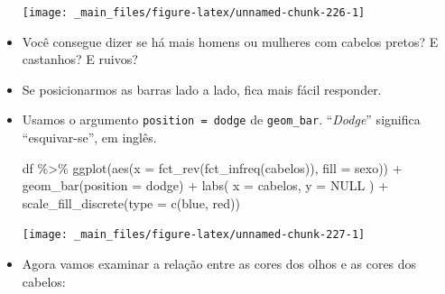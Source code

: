 \documentclass[
  11pt]{report}
\newenvironment{Shaded}{\begin{snugshade}}{\end{snugshade}}
\newcommand{\AttributeTok}[1]{\textcolor[rgb]{0.77,0.63,0.00}{#1}}
\newcommand{\ConstantTok}[1]{\textcolor[rgb]{0.00,0.00,0.00}{#1}}
\newcommand{\FunctionTok}[1]{\textcolor[rgb]{0.00,0.00,0.00}{#1}}
\newcommand{\NormalTok}[1]{#1}
\newcommand{\SpecialCharTok}[1]{\textcolor[rgb]{0.00,0.00,0.00}{#1}}
\newcommand{\StringTok}[1]{\textcolor[rgb]{0.31,0.60,0.02}{#1}}
\renewenvironment{Shaded}{
    \begin{mdframed}[%
      roundcorner=2pt,%
      innerleftmargin=5pt,%
      innerrightmargin=5pt,%
      topline=true,%
      leftline=true,%
      rightline=true,%
      bottomline=true,%
      linewidth=0.5pt,%
      linecolor=black!20,%
      backgroundcolor=black!2,%
      skipabove=2ex,%
      skipbelow=2.5ex%
    ]%
  }
  {
    \end{mdframed}
  }
\begin{document}
\begin{itemize}
  \begin{center}\texttt{[image: \_main\_files/figure-latex/unnamed-chunk-226-1]} \end{center}
\item
  Você consegue dizer se há mais homens ou mulheres com cabelos pretos? E castanhos? E ruivos?
\item
  Se posicionarmos as barras lado a lado, fica mais fácil responder.
\item
  Usamos o argumento \texttt{position\ =\ \textquotesingle{}dodge\textquotesingle{}} de \texttt{geom\_bar}. ``\emph{Dodge}'' significa ``esquivar-se'', em inglês.

\begin{Shaded}
\begin{Highlighting}[]
\NormalTok{df }\SpecialCharTok{\%\textgreater{}\%} 
  \FunctionTok{ggplot}\NormalTok{(}\FunctionTok{aes}\NormalTok{(}\AttributeTok{x =} \FunctionTok{fct\_rev}\NormalTok{(}\FunctionTok{fct\_infreq}\NormalTok{(cabelos)), }\AttributeTok{fill =}\NormalTok{ sexo)) }\SpecialCharTok{+}
    \FunctionTok{geom\_bar}\NormalTok{(}\AttributeTok{position =} \StringTok{\textquotesingle{}dodge\textquotesingle{}}\NormalTok{) }\SpecialCharTok{+}
    \FunctionTok{labs}\NormalTok{(}
      \AttributeTok{x =} \StringTok{\textquotesingle{}cabelos\textquotesingle{}}\NormalTok{,}
      \AttributeTok{y =} \ConstantTok{NULL}
\NormalTok{    ) }\SpecialCharTok{+}
    \FunctionTok{scale\_fill\_discrete}\NormalTok{(}\AttributeTok{type =} \FunctionTok{c}\NormalTok{(}\StringTok{\textquotesingle{}blue\textquotesingle{}}\NormalTok{, }\StringTok{\textquotesingle{}red\textquotesingle{}}\NormalTok{))}
\end{Highlighting}
\end{Shaded}

  \begin{center}\texttt{[image: \_main\_files/figure-latex/unnamed-chunk-227-1]} \end{center}
\item
  Agora vamos examinar a relação entre as cores dos olhos e as cores dos cabelos:


\end{itemize}
\end{document}
